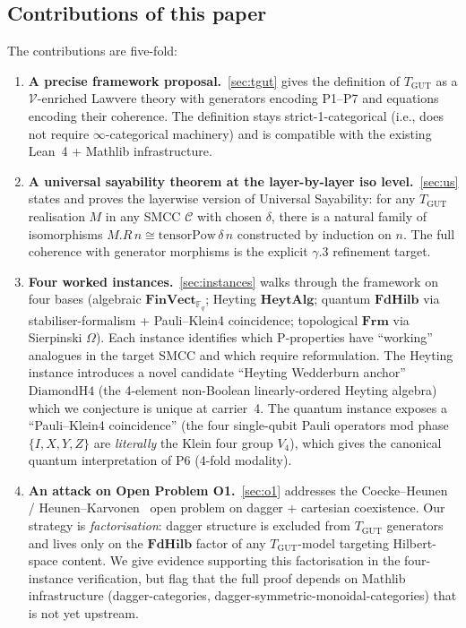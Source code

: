 \documentclass[11pt,a4paper]{article}
\theoremstyle{plain}
\theoremstyle{definition}
\theoremstyle{remark}
\newcommand{\F}{\mathbb{F}}
\newcommand{\cat}[1]{\mathbf{#1}}
\newcommand{\HeytAlg}{\cat{HeytAlg}}
\newcommand{\FdHilb}{\cat{FdHilb}}
\newcommand{\Frm}{\cat{Frm}}
\newcommand{\FinVect}{\cat{FinVect}}
\newcommand{\TGUT}{T_{\mathrm{GUT}}}
\newcommand{\DiamondH}{\mathrm{DiamondH4}}
\newcommand{\tensorPow}{\mathrm{tensorPow}}
\newcommand{\smcc}{SMCC}
\begin{document}
\subsection{Contributions of this paper}\label{sec:intro:contrib}

The contributions are five-fold:

\begin{enumerate}[leftmargin=*]
\item \textbf{A precise framework proposal.}~\cref{sec:tgut} gives the definition of $\TGUT$ as a $\mathcal{V}$-enriched Lawvere theory with generators encoding P1--P7 and equations encoding their coherence. The definition stays strict-1-categorical (i.e., does not require $\infty$-categorical machinery) and is compatible with the existing Lean~4 + Mathlib infrastructure.

\item \textbf{A universal sayability theorem at the layer-by-layer iso level.}~\cref{sec:us} states and proves the layerwise version of Universal Sayability: for any $\TGUT$ realisation $M$ in any \smcc{} $\mathcal{C}$ with chosen $\delta$, there is a natural family of isomorphisms $M.R\,n \cong \tensorPow\,\delta\,n$ constructed by induction on $n$. The full coherence with generator morphisms is the explicit $\gamma$.3 refinement target.

\item \textbf{Four worked instances.}~\cref{sec:instances} walks through the framework on four bases (algebraic $\FinVect_{\F_q}$; Heyting $\HeytAlg$; quantum $\FdHilb$ via stabiliser-formalism + Pauli--Klein4 coincidence; topological $\Frm$ via Sierpinski $\Omega$). Each instance identifies which P-properties have ``working'' analogues in the target \smcc{} and which require reformulation. The Heyting instance introduces a novel candidate ``Heyting Wedderburn anchor'' $\DiamondH$ (the 4-element non-Boolean linearly-ordered Heyting algebra) which we conjecture is unique at carrier~4. The quantum instance exposes a ``Pauli--Klein4 coincidence'' (the four single-qubit Pauli operators mod phase $\{I, X, Y, Z\}$ are \emph{literally} the Klein four group $V_4$), which gives the canonical quantum interpretation of P6 (4-fold modality).

\item \textbf{An attack on Open Problem O1.}~\cref{sec:o1} addresses the Coecke--Heunen~\cite{CH16} / Heunen--Karvonen~\cite{HK19} open problem on dagger + cartesian coexistence. Our strategy is \emph{factorisation}: dagger structure is excluded from $\TGUT$ generators and lives only on the $\FdHilb$ factor of any $\TGUT$-model targeting Hilbert-space content. We give evidence supporting this factorisation in the four-instance verification, but flag that the full proof depends on Mathlib infrastructure (dagger-categories, dagger-symmetric-monoidal-categories) that is not yet upstream.


\end{enumerate}
\end{document}
